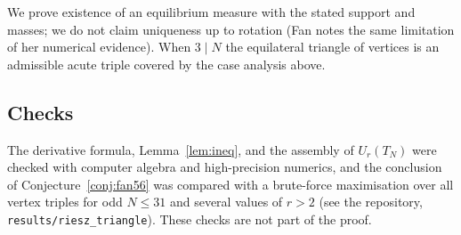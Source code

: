 \begin{remark}
We prove existence of an equilibrium measure with the stated support and masses; we do not claim uniqueness up to rotation (Fan notes the same limitation of her numerical evidence). When $3\mid N$ the equilateral triangle of vertices is an admissible acute triple covered by the case analysis above.
\end{remark}

\subsection{Checks}
The derivative formula, Lemma~\ref{lem:ineq}, and the assembly of $U_r(T_N)$ were checked with computer algebra and high-precision numerics, and the conclusion of Conjecture~\ref{conj:fan56} was compared with a brute-force maximisation over all vertex triples for odd $N\le31$ and several values of $r>2$ (see the repository, \texttt{results/riesz\_triangle}). These checks are not part of the proof.

